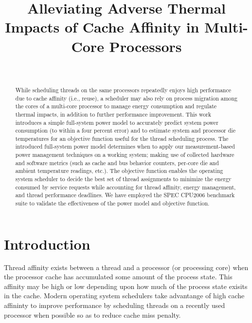 \documentclass[12pt,onecolumn]{ULieeetran}
\begin{document}
\title{Alleviating Adverse Thermal Impacts of Cache Affinity in
  Multi-Core Processors}
\author[]{~} 
\affil[]{~}
\maketitle
\newtheorem{defn}{Definition}
\newtheorem{thm}{Theorem}
\thispagestyle{empty}
\doublespacing
\begin{abstract}
  While scheduling threads on the same processors repeatedly enjoys high
  performance due to cache affinity (i.e., reuse), a scheduler may also
  rely on process migration among the cores of a multi-core processor to
  manage energy consumption and regulate thermal impacts, in addition to
  further performance improvement.  This work introduces a simple
  full-system power model to accurately predict system power consumption
  (to within a four percent error) and to estimate system and processor
  die temperatures for an objective function useful for the thread
  scheduling process.  The introduced full-system power model determines
  when to apply our measurement-based power management techniques on a
  working system; making use of collected hardware and software metrics
  (such as cache and bus behavior counters, per-core die and ambient
  temperature readings, etc.).  The objective function enables the
  operating system scheduler to decide the best set of thread
  assignments to minimize the energy consumed by service requests while
  accounting for thread affinity, energy management, and thread
  performance deadlines. We have employed the SPEC CPU2006 benchmark
  suite to validate the effectiveness of the power model and objective
  function.
\end{abstract}

\section{Introduction}
\label{sec:Introduction}

Thread affinity exists between a thread and a processor (or processing
core) when the processor cache has accumulated some amount of the
process state.  This affinity may be high or low depending upon how much
of the process state exisits in the cache. Modern operating system
schedulers take advantange of high cache affininty to improve
performance by scheduling threads on a recently used processor when
possible so as to reduce cache miss penalty.
\end{document}
